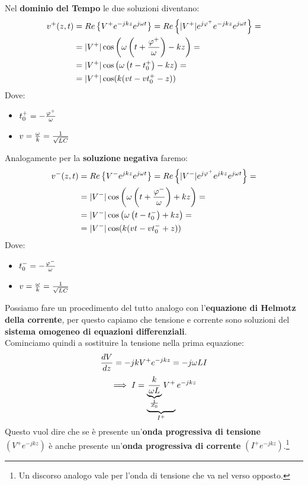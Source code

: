 Nel \textbf{dominio del Tempo} le due soluzioni diventano:
\begin{equation*}
\begin{aligned}
    v^+(z,t) &= Re\left\{V^+ e^{-jkz} e^{j\omega t}\right\} = Re\left\{|V^+|e^{j\varphi^+} e^{-jkz} e^{j\omega t}\right\} =\\
    &= |V^+| \cos\left(\omega \left(t + \frac{\varphi^+}{\omega} \right) - kz \right) =\\
    &=|V^+| \cos\left(\omega \left(t - t_0^+ \right) - kz \right) =\\
    &= |V^+| \cos(k(vt - vt_0^+ - z)) 
\end{aligned}
\end{equation*}
Dove:
\begin{itemize}
    \item $t_0^+ = - \frac{\varphi^+}{\omega}$
    \item $v = \frac{\omega}{k} = \frac{1}{\sqrt{LC}}$
\end{itemize}
\vspace{1cm}
Analogamente per la \textbf{soluzione} \textbf{negativa} faremo:
\begin{equation*}
\begin{aligned}
    v^-(z,t) &= Re\left\{V^- e^{jkz} e^{j\omega t}\right\} = Re\left\{|V^-|e^{j\varphi^+} e^{jkz} e^{j\omega t}\right\} =\\
    &= |V^-| \cos\left(\omega \left(t + \frac{\varphi^-}{\omega} \right) + kz \right) =\\
    &=|V^-| \cos\left(\omega \left(t - t_0^- \right) + kz \right) =\\
    &= |V^-| \cos(k(vt - vt_0^- + z)) 
\end{aligned}
\end{equation*}
Dove:
\begin{itemize}
    \item $t_0^- = - \frac{\varphi^-}{\omega}$
    \item $v = \frac{\omega}{k} = \frac{1}{\sqrt{LC}}$
\end{itemize}
Possiamo fare un procedimento del tutto analogo con l'\textbf{equazione di Helmotz della corrente}, per questo capiamo che tensione e corrente sono soluzioni del \textbf{sistema omogeneo di equazioni differenziali}.\\ 

Cominciamo quindi a sostituire la tensione nella prima equazione:
\begin{equation*}
    \frac{dV}{dz} = - j k V^+ e^{-jkz} = -j \omega L I
\end{equation*}
\begin{equation*}
    \implies I = \underbrace{\underbrace{\frac{k}{\omega L}}_{\frac{1}{Z_0}} V^+}_{I^+} e^{-jkz}
\end{equation*}
Questo vuol dire che se è presente un'\textbf{onda progressiva di tensione} $\left(V^+ e^{-jkz}\right)$ è anche presente un'\textbf{onda progressiva di corrente} $\left(I^+ e^{-jkz}\right)$.\footnote{Un discorso analogo vale per l'onda di tensione che va nel verso opposto.}






